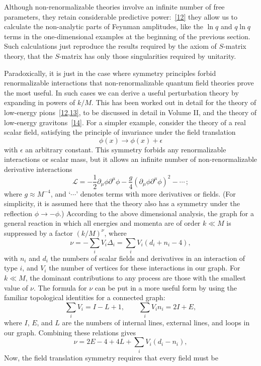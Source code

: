 Although non-renormalizable theories involve an infinite number of free
parameters, they retain considerable predictive
power:~\hyperref[ref:12.12]{[12]} they allow us to calculate the non-analytic
parts of Feynman amplitudes, like the $\ln q$ and $q\ln q$ terms in the
one-dimensional examples at the beginning of the previous section. Such
calculations just reproduce the results required by the axiom of $S$-matrix
theory, that the $S$-matrix has only those singularities required by unitarity.

Paradoxically, it is just in the case where symmetry principles forbid
renormalizable interactions that non-renormalizable quantum field theories
prove the most useful. In such cases we can derive a useful perturbation theory
by expanding in powers of $k/M$. This has been worked out in detail for the
theory of low-energy pions~\hyperref[ref:12.12]{[12,}\hyperref[ref:12.13]{13]},
to be discussed in detail in Volume II, and the theory of low-energy
gravitons~\hyperref[ref:12.14]{[14]}. For a simpler example, consider the
theory of a real scalar field, satisfying the principle of invariance under
the field translation
\[
\phi(x)\longrightarrow\phi(x)+\epsilon
\]
with $\epsilon$ an arbitrary constant. This symmetry forbids any renormalizable
interactions or scalar mass, but it allows an infinite number of
non-renormalizable derivative interactions
\[
\mathcal L=-\frac12\partial_\mu\phi\partial^\mu\phi
-\frac{g}{4}(\partial_\mu\phi\partial^\mu\phi)^2-\cdots\,;
\]
where $g\approx M^{-4}$, and `$\cdots$' denotes terms with more derivatives or
fields. (For simplicity, it is assumed here that the theory also has a
symmetry under the reflection $\phi\to-\phi$.) According to the above
dimensional analysis, the graph for a general reaction in which all energies
and momenta are of order $k\ll M$ is suppressed by a factor $(k/M)^\nu$, where
\[
\nu=-\sum_i V_i\Delta_i=\sum_i V_i(d_i+n_i-4),
\]
with $n_i$ and $d_i$ the numbers of scalar fields and derivatives in an
interaction of type $i$, and $V_i$ the number of vertices for these
interactions in our graph. For $k\ll M$, the dominant contributions to any
process are those with the smallest value of $\nu$. The formula for $\nu$ can
be put in a more useful form by using the familiar topological identities for
a connected graph:
\[
\sum_i V_i=I-L+1,\qquad \sum_i V_i n_i=2I+E,
\]
where $I$, $E$, and $L$ are the numbers of internal lines, external lines,
and loops in our graph. Combining these relations gives
\[
\nu=2E-4+4L+\sum_i V_i(d_i-n_i),
\]
Now, the field translation symmetry requires that every field must be
